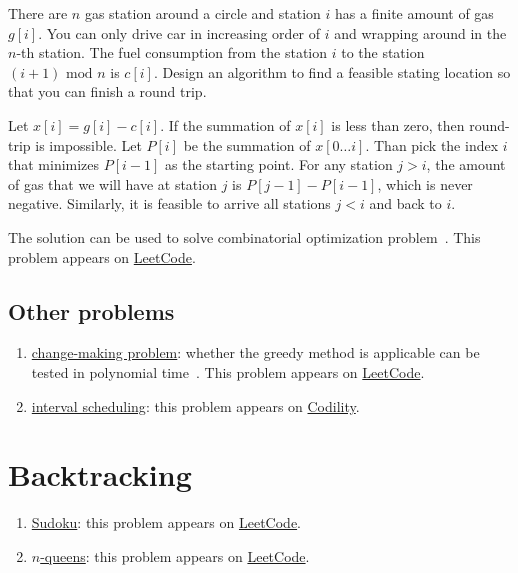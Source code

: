 \begin{Exercise}[title=Gasoline puzzle]
There are $n$ gas station around a circle and station $i$ has a finite amount of gas $g[i]$. 
You can only drive car in increasing order of $i$ and wrapping around in the $n$-th station. 
The fuel consumption from the station $i$ to the station $(i + 1) \text{ mod } n$ is $c[i]$. 
Design an algorithm to find a feasible stating location so that you can finish a round trip.
\end{Exercise}
\begin{Answer}
Let $x[i] = g[i] - c[i]$. If the summation of $x[i]$ is less than zero, then round-trip is impossible. 
Let $P[i]$ be the summation of $x[0\dots i]$. 
Than pick the index $i$ that minimizes $P[i-1]$ as the starting point. 
For any station $j > i$, the amount of gas that we will have at station $j$ is $P[j-1] - P[i-1]$, which is never negative. 
Similarly, it is feasible to arrive all stations $j < i$ and back to $i$.
\begin{remark}
The solution can be used to solve combinatorial optimization problem~\cite{Berger2011}. This problem appears on \href{https://leetcode.com/problems/gas-station/}{LeetCode}.
\end{remark}
\end{Answer}


\subsection{Other problems}
\begin{enumerate}
\item \href{https://en.wikipedia.org/wiki/Change-making_problem}{change-making problem}: whether the greedy method is applicable can be tested in polynomial time~\cite{Pearson2005}. This problem appears on \href{https://leetcode.com/problems/coin-change/}{LeetCode}.
\item \href{https://en.wikipedia.org/wiki/Interval_scheduling#Interval_Scheduling_Maximization}{interval scheduling}: this problem appears on \href{https://codility.com/demo/take-sample-test/max_nonoverlapping_segments/}{Codility}.
\end{enumerate}

\section{Backtracking}
\begin{enumerate}
\item \href{https://en.wikipedia.org/wiki/Sudoku}{Sudoku}: this problem appears on \href{https://leetcode.com/problems/sudoku-solver/}{LeetCode}.
\item \href{https://en.wikipedia.org/wiki/Eight_queens_puzzle}{$n$-queens}: this problem appears on \href{https://leetcode.com/problems/n-queens-ii/}{LeetCode}.
\end{enumerate}

